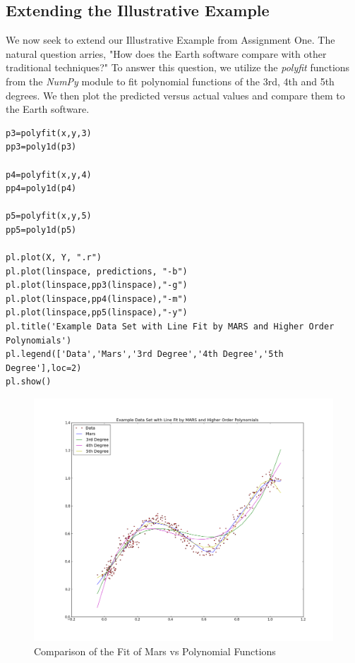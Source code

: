 \subsection{Extending the Illustrative Example} 

We now seek to extend our Illustrative Example from Assignment One. The natural question arries, "How does the Earth software compare with other traditional techniques?" To answer this question, we utilize the \emph{polyfit} functions from the \emph{NumPy} module to fit polynomial functions of the 3rd, 4th and 5th degrees. We then plot the predicted versus actual values and compare them to the Earth software.

\begin{lstlisting}[caption={Fit Polynomial Functions of the 3rd, 4th and 5th Degrees.  },label=lst:expected_times,firstnumber=43]
p3=polyfit(x,y,3)
pp3=poly1d(p3)

p4=polyfit(x,y,4)
pp4=poly1d(p4)

p5=polyfit(x,y,5)
pp5=poly1d(p5)

pl.plot(X, Y, ".r")
pl.plot(linspace, predictions, "-b")
pl.plot(linspace,pp3(linspace),"-g")
pl.plot(linspace,pp4(linspace),"-m")
pl.plot(linspace,pp5(linspace),"-y")
pl.title('Example Data Set with Line Fit by MARS and Higher Order Polynomials')
pl.legend(['Data','Mars','3rd Degree','4th Degree','5th Degree'],loc=2)
pl.show()
\end{lstlisting}
\begin{figure}[H]
    \centering
       \includegraphics[width=6.5in]{example_data_poly_fit.png}
    \caption{Comparison of the Fit of Mars vs Polynomial Functions}
    \label{Example Data}
\end{figure}

